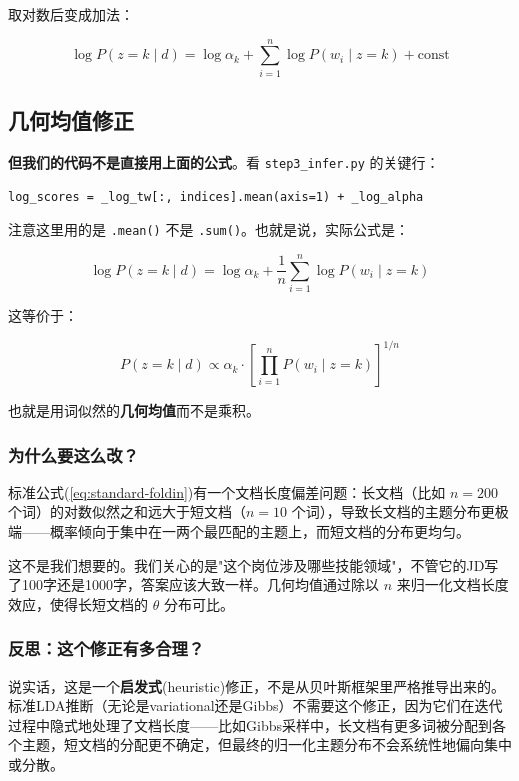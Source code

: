 \documentclass[12pt,a4paper]{ctexart}
\begin{document}
取对数后变成加法：

\begin{equation}
\log P(z=k \mid d) = \log \alpha_k + \sum_{i=1}^{n} \log P(w_i \mid z=k) + \text{const}
\end{equation}

\subsection{几何均值修正}

\textbf{但我们的代码不是直接用上面的公式}。看 \texttt{step3\_infer.py} 的关键行：

\begin{verbatim}
log_scores = _log_tw[:, indices].mean(axis=1) + _log_alpha
\end{verbatim}

注意这里用的是 \texttt{.mean()} 不是 \texttt{.sum()}。也就是说，实际公式是：

\begin{equation}
\log P(z=k \mid d) = \log \alpha_k + \frac{1}{n}\sum_{i=1}^{n} \log P(w_i \mid z=k)
\label{eq:geomean-foldin}
\end{equation}

这等价于：

\begin{equation}
P(z=k \mid d) \propto \alpha_k \cdot \left[\prod_{i=1}^{n} P(w_i \mid z=k)\right]^{1/n}
\end{equation}

也就是用词似然的\textbf{几何均值}而不是乘积。

\subsubsection{为什么要这么改？}

标准公式(\ref{eq:standard-foldin})有一个文档长度偏差问题：长文档（比如 $n=200$ 个词）的对数似然之和远大于短文档（$n=10$ 个词），导致长文档的主题分布更极端——概率倾向于集中在一两个最匹配的主题上，而短文档的分布更均匀。

这不是我们想要的。我们关心的是"这个岗位涉及哪些技能领域"，不管它的JD写了100字还是1000字，答案应该大致一样。几何均值通过除以 $n$ 来归一化文档长度效应，使得长短文档的 $\theta$ 分布可比。

\subsubsection{反思：这个修正有多合理？}

说实话，这是一个\textbf{启发式}(heuristic)修正，不是从贝叶斯框架里严格推导出来的。标准LDA推断（无论是variational还是Gibbs）不需要这个修正，因为它们在迭代过程中隐式地处理了文档长度——比如Gibbs采样中，长文档有更多词被分配到各个主题，短文档的分配更不确定，但最终的归一化主题分布不会系统性地偏向集中或分散。
\end{document}
